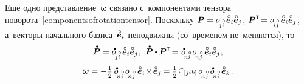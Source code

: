 \begin{otherlanguage}{russian}
Ещё одно представление~$\bm{\omega}$ связано с~компонентами тензора поворота~\eqref{componentsofrotationtensor}. Поскольку ${\bm{P} = \cosinematrix{\!j\mathcircabove{i}} \hspace{.4ex} \mathcircabove{\bm{e}}_i \mathcircabove{\bm{e}}_j}$, ${\bm{P}^{\T} \hspace{-0.32ex} = \cosinematrix{\hspace{-0.2ex}i\mathcircabove{j}} \hspace{.4ex} \mathcircabove{\bm{e}}_i \mathcircabove{\bm{e}}_j}$, а~векторы начального базиса~${\mathcircabove{\bm{e}}_i}$ неподвижны (со~временем не~меняются), то
\nopagebreak\vspace{.25em}\[ \mathdotabove{\bm{P}} = \cosinematrixdotted{\!j\mathcircabove{i}} \hspace{.4ex} \mathcircabove{\bm{e}}_i \mathcircabove{\bm{e}}_j
\hspace{.1ex} , \:\,
\mathdotabove{\bm{P}} \dotp \bm{P}^{\T} \hspace{-0.32ex} = \hspace{.1ex} \cosinematrixdotted{\hspace{-0.4ex}n\mathcircabove{i}} \hspace{.4ex} \cosinematrix{\hspace{-0.4ex}n\mathcircabove{j}} \hspace{.4ex} \mathcircabove{\bm{e}}_i \mathcircabove{\bm{e}}_j
\hspace{.1ex}, \]
\nopagebreak\vspace{-0.64em}\begin{equation}
\bm{\omega} = - \hspace{.1ex} \smalldisplaystyleonehalf \hspace{.4ex} \cosinematrixdotted{\hspace{-0.4ex}n\mathcircabove{i}} \hspace{.4ex} \cosinematrix{\hspace{-0.4ex}n\mathcircabove{j}} \hspace{.5ex} \mathcircabove{\bm{e}}_i \hspace{-0.3ex}\times\hspace{-0.3ex} \mathcircabove{\bm{e}}_j \hspace{-0.1ex} =
\smalldisplaystyleonehalf \hspace{.2ex} \permutationsparitysymbols{j\hspace{-0.06ex}ik} \hspace{.32ex} \cosinematrix{\hspace{-0.4ex}n\mathcircabove{j}} \hspace{.4ex} \cosinematrixdotted{\hspace{-0.4ex}n\mathcircabove{i}} \hspace{.4ex} \mathcircabove{\bm{e}}_k
\hspace{.2ex} .
\end{equation}


\end{otherlanguage}
